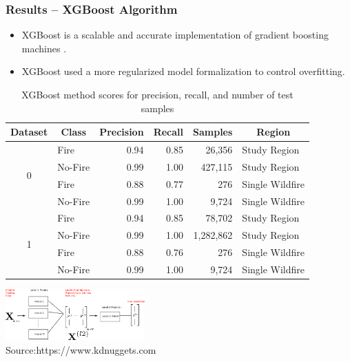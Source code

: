 \documentclass{beamer}
\begin{document}
\begin{frame}
  \frametitle{Results -- XGBoost Algorithm}
  \scriptsize
   \begin{itemize}
 \item XGBoost is a scalable and accurate implementation of gradient boosting 
machines \citep{Chen:2016}.
 \item  XGBoost used a more regularized model formalization to control 
overfitting.

 \end{itemize}


 
\begin{table}
\centering
   \caption{XGBoost method scores for precision, recall, and number of test 
samples}
    \label{tbl:xgb_results}
\begin{tabular}{c l r r r l}
 \toprule
 \multicolumn{1}{c}{Dataset} & \multicolumn{1}{c}{Class} & 
\multicolumn{1}{c}{Precision} & \multicolumn{1}{c}{Recall} & 
\multicolumn{1}{c}{Samples} & \multicolumn{1}{c}{Region} \\
 \midrule
\multirow{4}{*}{0} 
 & Fire & 0.94 & 0.85  & 26,356 & Study Region\\
 & No-Fire & 0.99 & 1.00 & 427,115 & Study Region\\ 
 
 & Fire & 0.88 & 0.77  & 276 & Single Wildfire\\
 & No-Fire & 0.99 & 1.00 & 9,724 & Single Wildfire\\ 
 \midrule
\multirow{4}{*}{1} 
 & Fire & 0.94 & 0.85 & 78,702 & Study Region\\
 & No-Fire & 0.99 & 1.00 & 1,282,862 & Study Region\\ 
 
 & Fire & 0.88 & 0.76 & 276 & Single Wildfire\\
 & No-Fire & 0.99 & 1.00 & 9,724 & Single Wildfire\\ 
 \bottomrule
\end{tabular}
\end{table}

\centering
\includegraphics[width=0.4\textwidth]{figs/workflow.png}
\\
\tiny{Source:https://www.kdnuggets.com}


\end{frame}  
\end{document}
